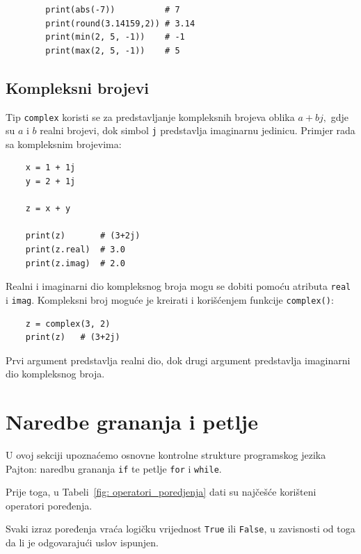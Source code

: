 \begin{example}
	\begin{verbatim}
		print(abs(-7))          # 7
		print(round(3.14159,2)) # 3.14
		print(min(2, 5, -1))    # -1
		print(max(2, 5, -1))    # 5
	\end{verbatim}
\end{example}

\subsection{Kompleksni brojevi}

Tip \texttt{complex} koristi se za predstavljanje kompleksnih brojeva oblika  $a+bj,$ gdje su $a$ i $b$ realni brojevi, dok simbol \texttt{j} predstavlja imaginarnu jedinicu.  Primjer rada sa kompleksnim brojevima:

\begin{verbatim}
	x = 1 + 1j
	y = 2 + 1j
	
	z = x + y
	
	print(z)       # (3+2j)
	print(z.real)  # 3.0
	print(z.imag)  # 2.0
\end{verbatim}

Realni i imaginarni dio kompleksnog broja mogu se dobiti pomoću atributa \texttt{real} i \texttt{imag}.  Kompleksni broj moguće je kreirati i korišćenjem funkcije \texttt{complex()}:

\begin{verbatim}
	z = complex(3, 2)
	print(z)   # (3+2j)
\end{verbatim}

Prvi argument predstavlja realni dio, dok drugi argument predstavlja imaginarni dio kompleksnog broja.

\section{Naredbe grananja i petlje}

U ovoj sekciji upoznaćemo osnovne kontrolne strukture programskog jezika Pajton: naredbu grananja \texttt{if} te petlje \texttt{for} i \texttt{while}.

Prije toga, u Tabeli~\ref{fig: operatori_poredjenja} dati su najčešće korišteni operatori poređenja.

Svaki izraz poređenja vraća logičku vrijednost \texttt{True} ili \texttt{False}, u zavisnosti od toga da li je odgovarajući uslov ispunjen.

